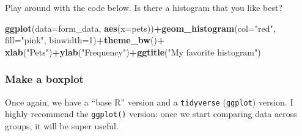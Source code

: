 \documentclass[
]{article}
\newenvironment{Shaded}{\begin{snugshade}}{\end{snugshade}}
\newcommand{\AttributeTok}[1]{\textcolor[rgb]{0.13,0.29,0.53}{#1}}
\newcommand{\DecValTok}[1]{\textcolor[rgb]{0.00,0.00,0.81}{#1}}
\newcommand{\FunctionTok}[1]{\textcolor[rgb]{0.13,0.29,0.53}{\textbf{#1}}}
\newcommand{\NormalTok}[1]{#1}
\newcommand{\SpecialCharTok}[1]{\textcolor[rgb]{0.81,0.36,0.00}{\textbf{#1}}}
\newcommand{\StringTok}[1]{\textcolor[rgb]{0.31,0.60,0.02}{#1}}
\begin{document}
\begin{Shaded}
\end{Shaded}

Play around with the code below. Is there a histogram that you like
best?

\begin{Shaded}
\begin{Highlighting}[]
\FunctionTok{ggplot}\NormalTok{(}\AttributeTok{data=}\NormalTok{form\_data, }\FunctionTok{aes}\NormalTok{(}\AttributeTok{x=}\NormalTok{pets))}\SpecialCharTok{+}\FunctionTok{geom\_histogram}\NormalTok{(}\AttributeTok{col=}\StringTok{"red"}\NormalTok{, }\AttributeTok{fill=}\StringTok{"pink"}\NormalTok{, }\AttributeTok{binwidth=}\DecValTok{1}\NormalTok{)}\SpecialCharTok{+}\FunctionTok{theme\_bw}\NormalTok{()}\SpecialCharTok{+}
  \FunctionTok{xlab}\NormalTok{(}\StringTok{"Pets"}\NormalTok{)}\SpecialCharTok{+}\FunctionTok{ylab}\NormalTok{(}\StringTok{"Frequency"}\NormalTok{)}\SpecialCharTok{+}\FunctionTok{ggtitle}\NormalTok{(}\StringTok{"My favorite histogram"}\NormalTok{)}
\end{Highlighting}
\end{Shaded}

\subsubsection{Make a boxplot}\label{make-a-boxplot}

Once again, we have a ``base R'' version and a \texttt{tidyverse}
(\texttt{ggplot}) version. I highly recommend the \texttt{ggplot()}
version: once we start comparing data across groups, it will be super
useful.

\begin{Shaded}
\end{Shaded}
\end{document}
